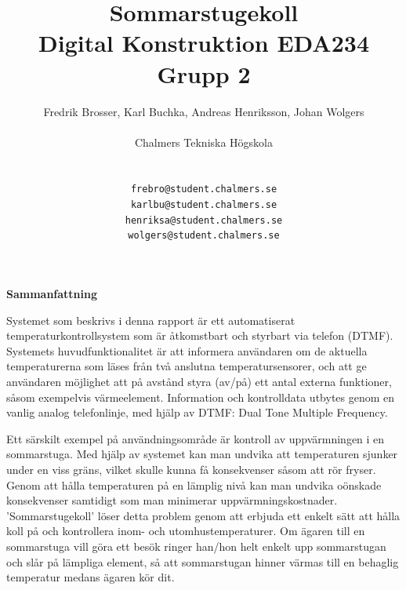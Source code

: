 \documentclass[a4paper,11pt]{article}
\begin{document}
\title{{\huge Sommarstugekoll} \\
	Digital Konstruktion EDA234 \\ Grupp 2}
\author{Fredrik Brosser, Karl Buchka, Andreas Henriksson, Johan Wolgers \\ \\
   	Chalmers Tekniska Högskola \\ \\
	\begin{tabular}{l c r}
		\texttt{frebro} & \texttt{@} & \texttt{student.chalmers.se}\\
		\texttt{karlbu} & \texttt{@} & \texttt{student.chalmers.se}\\
		\texttt{henriksa} & \texttt{@} & \texttt{student.chalmers.se}\\
		\texttt{wolgers} & \texttt{@} & \texttt{student.chalmers.se}\\\\
	\end{tabular}
	}

\maketitle

\pagebreak

\tableofcontents

\pagebreak

\begin{center}
	{\noindent \bf Sammanfattning}
\end{center}

	Systemet som beskrivs i denna rapport är ett automatiserat temperaturkontrollsystem som är åtkomstbart och styrbart via
	telefon (DTMF). Systemets huvudfunktionalitet är att informera användaren om de aktuella temperaturerna som läses från
	två anslutna temperatursensorer, och att ge användaren möjlighet att på avstånd styra (av/på) ett antal externa funktioner,
	såsom exempelvis värmeelement. Information och kontrolldata utbytes genom en vanlig analog telefonlinje, med hjälp av DTMF:
	Dual Tone Multiple Frequency. 

	Ett särskilt exempel på användningsområde är kontroll av uppvärmningen i en sommarstuga. Med hjälp av systemet kan man
	undvika att temperaturen sjunker under en viss gräns, vilket skulle kunna få konsekvenser såsom att rör fryser. Genom att
	hålla temperaturen på en lämplig nivå kan man undvika oönskade konsekvenser samtidigt som man minimerar uppvärmningskostnader.
	'Sommarstugekoll' löser detta problem genom att erbjuda ett enkelt sätt att hålla koll på och kontrollera inom- och utomhustemperaturer.
	Om ägaren till en sommarstuga vill göra ett besök ringer han/hon helt enkelt upp sommarstugan och slår på lämpliga element, så att
	sommarstugan hinner värmas till en behaglig temperatur medans ägaren kör dit.
\end{document}
